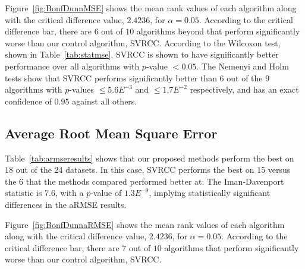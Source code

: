 \documentclass[reqno]{vcuthesis}
\numberwithin{equation}{chapter}
\begin{document}
Figure~{\ref{fig:BonfDunnMSE}} shows the mean rank values of each algorithm along with the critical difference value, $2.4236$, for $\alpha = 0.05$. According to the critical difference bar, there are $6$ out of $10$ algorithms beyond that perform significantly worse than our control algorithm, SVRCC. According to the Wilcoxon test, shown in Table~{\ref{tab:statmse}}, SVRCC is shown to have significantly better performance over all algorithms with $p$-value $< 0.05$. The Nemenyi and Holm tests show that SVRCC performs significantly better than $6$ out of the $9$ algorithms with $p$-values $\leq 5.6E^{-3}$ and $\leq 1.7E^{-2}$ respectively, and has an exact confidence of $0.95$ against all others.

\subsection{Average Root Mean Square Error}\label{subsec:armse}
Table~{\ref{tab:armseresults}} shows that our proposed methods perform the best on $18$ out of the $24$ datasets. In this case, SVRCC performs the best on $15$ versus the $6$ that the methods compared performed better at. The Iman-Davenport statistic is $7.6$, with a $p$-value of $1.3E^{-9}$, implying statistically significant differences in the aRMSE results.

Figure~{\ref{fig:BonfDunnaRMSE}} shows the mean rank values of each algorithm along with the critical difference value, $2.4236$, for $\alpha = 0.05$. According to the critical difference bar, there are $7$ out of $10$ algorithms that perform significantly worse than our control algorithm, SVRCC.
\end{document}

